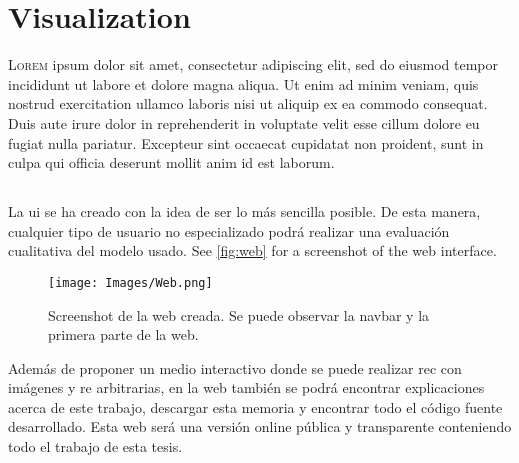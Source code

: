 

\chapter{Visualization}\label{cha:web}



\lettrine{L}{orem} ipsum dolor sit amet, consectetur
adipiscing elit, sed do eiusmod tempor incididunt ut labore et dolore magna
aliqua. Ut enim ad minim veniam, quis nostrud exercitation ullamco laboris nisi
ut aliquip ex ea commodo consequat. Duis aute irure dolor in reprehenderit in
voluptate velit esse cillum dolore eu fugiat nulla pariatur. Excepteur sint
occaecat cupidatat non proident, sunt in culpa qui officia deserunt mollit anim
id est laborum.


\section{}%
\label{sec:frontend}

La \gls{ui} se ha creado con la idea de ser lo más sencilla posible. De esta
manera, cualquier tipo de usuario no especializado podrá realizar una
evaluación cualitativa del modelo usado. See \vref{fig:web} for a screenshot of
the web interface.

\begin{figure}[ht]
  \centering
  \texttt{[image: Images/Web.png]}
  \caption[Screenshot de la web creada]{Screenshot de la web creada. Se puede
    observar la navbar y la primera parte de la web.}\label{fig:web}
\end{figure}

Además de proponer un medio interactivo donde se puede realizar \gls{rec} con
imágenes y \gls{re} arbitrarias, en la web también se podrá encontrar
explicaciones acerca de este trabajo, descargar esta memoria y encontrar todo
el código fuente desarrollado. Esta web será una versión online pública y
transparente conteniendo todo el trabajo de esta tesis.

